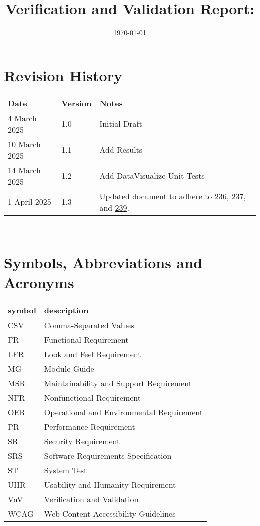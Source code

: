 \documentclass[12pt, titlepage]{article}
\begin{document}
\title{Verification and Validation Report: \progname} 
\author{\authname}
\date{\today}
	
\maketitle


\section{Revision History}

\begin{tabularx}{\textwidth}{p{3cm}p{2cm}X} \toprule {\bf Date} & {\bf Version}
& {\bf Notes}\\
\midrule
4 March 2025 & 1.0 & Initial Draft\\
10 March 2025 & 1.1 & Add Results\\
14 March 2025 & 1.2 & Add DataVisualize Unit Tests\\
1 April 2025 & 1.3 & Updated document to adhere to
\href{https://github.com/SumanyaG/Alkalytics/issues/236}{236},
\href{https://github.com/SumanyaG/Alkalytics/issues/237}{237}, and
\href{https://github.com/SumanyaG/Alkalytics/issues/239}{239}. \\
\bottomrule
\end{tabularx}

~\newpage

\section{Symbols, Abbreviations and Acronyms}

\renewcommand{\arraystretch}{1.2}
\begin{tabular}{l l} 
  \toprule		
  \textbf{symbol} & \textbf{description}\\
  \midrule
  CSV & Comma-Separated Values\\
  FR & Functional Requirement\\
  LFR & Look and Feel Requirement\\
  MG & Module Guide\\
  MSR & Maintainability and Support Requirement\\
  NFR & Nonfunctional Requirement\\
  OER & Operational and Environmental Requirement\\
  PR & Performance Requirement\\
  SR & Security Requirement\\
  SRS & Software Requirements Specification\\
  ST & System Test\\
  UHR & Usability and Humanity Requirement\\
  VnV & Verification and Validation\\
  WCAG & Web Content Accessibility Guidelines\\
  \bottomrule
\end{tabular}\\
\end{document}
